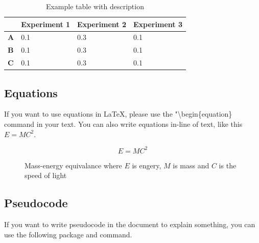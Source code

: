 \documentclass{article}
\begin{document}
\begin{table}[ht!]
\centering
    \begin{tabular}{l|l|l|l|}
        \cline{2-4}
                                         & \textbf{Experiment 1} & \textbf{Experiment 2} & \textbf{Experiment 3} \\ \hline
        \multicolumn{1}{|l|}{\textbf{A}} & 0.1                   & 0.3                   & 0.1                   \\ \hline
        \multicolumn{1}{|l|}{\textbf{B}} & 0.1                   & 0.3                   & 0.1                   \\ \hline
        \multicolumn{1}{|l|}{\textbf{C}} & 0.1                   & 0.3                   & 0.1                   \\ \hline
    \end{tabular}
\caption{Example table with description}
\label{tab:example-table}
\end{table}


\subsection*{Equations}
If you want to use equations in LaTeX, please use the "\textbackslash begin\{equation\} command in your text. You can also write equations in-line of text, like this $E=MC^2$.

\begin{figure}[ht]
    \centering
    \begin{equation}
    E = MC^2
    \end{equation}

    \caption{Mass-energy equivalance where $E$ is engery, $M$ is mass and $C$ is the speed of light }
    \label{equation:my_label}
\end{figure}


\newpage
\subsection*{Pseudocode}
If you want to write pseudocode in the document to explain something, you can use the following package and command. 
\end{document}
